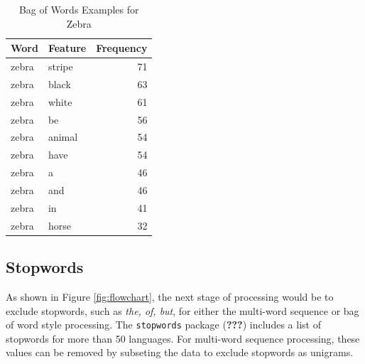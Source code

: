 \documentclass[man]{apa6}
\newenvironment{Shaded}{\begin{snugshade}}{\end{snugshade}}
\newcommand{\CommentTok}[1]{\textcolor[rgb]{0.56,0.35,0.01}{\textit{#1}}}
\newcommand{\DataTypeTok}[1]{\textcolor[rgb]{0.13,0.29,0.53}{#1}}
\newcommand{\KeywordTok}[1]{\textcolor[rgb]{0.13,0.29,0.53}{\textbf{#1}}}
\newcommand{\NormalTok}[1]{#1}
\newcommand{\OperatorTok}[1]{\textcolor[rgb]{0.81,0.36,0.00}{\textbf{#1}}}
\newcommand{\StringTok}[1]{\textcolor[rgb]{0.31,0.60,0.02}{#1}}
\begin{document}
\begin{table}[t]

\caption{\label{tab:tab5}Bag of Words Examples for Zebra}
\centering
\begin{tabular}{llr}
\toprule
Word & Feature & Frequency\\
\midrule
zebra & stripe & 71\\
zebra & black & 63\\
zebra & white & 61\\
zebra & be & 56\\
zebra & animal & 54\\
\addlinespace
zebra & have & 54\\
zebra & a & 46\\
zebra & and & 46\\
zebra & in & 41\\
zebra & horse & 32\\
\bottomrule
\end{tabular}
\end{table}

\hypertarget{stopwords}{%
\subsection{Stopwords}\label{stopwords}}

As shown in Figure \ref{fig:flowchart}, the next stage of processing would be to exclude stopwords, such as \emph{the, of, but}, for either the multi-word sequence or bag of word style processing. The \texttt{stopwords} package ({\textbf{???}}) includes a list of stopwords for more than 50 languages. For multi-word sequence processing, these values can be removed by subseting the data to exclude stopwords as unigrams.

\scriptsize

\begin{Shaded}
\end{Shaded}
\end{document}
